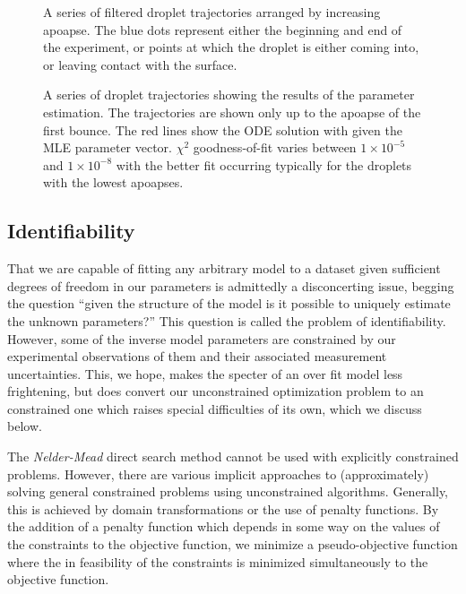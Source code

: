 \documentclass[12pt,a4paper,oneside]{book}
\begin{document}
\begin{figure}[h]
    \centering
    \resizebox{\textwidth}{!}{}
    \caption{A series of filtered droplet trajectories arranged by increasing apoapse. The blue dots represent either the beginning and end of the experiment, or points at which the droplet is either coming into, or leaving contact with the surface.}
    \label{fig:trajectories}
\end{figure}
\begin{figure}[h]
    \centering
    \resizebox{\textwidth}{!}{}
    \caption{A series of droplet trajectories showing the results of the parameter estimation. The trajectories are shown only up to the apoapse of the first bounce. The red lines show the ODE solution with given the MLE parameter vector. $\chi^2$ goodness-of-fit varies between $1 \times 10^{-5}$ and $1 \times 10^{-8}$ with the better fit occurring typically for the droplets with the lowest apoapses.}
    \label{fig:inverse_problem}
\end{figure}

\subsection{Identifiability}
That we are capable of fitting any arbitrary model to a dataset given sufficient degrees of freedom in our parameters is admittedly a disconcerting issue, begging the question ``given the structure of the model is it possible to uniquely estimate the unknown parameters?'' This question is called the problem of identifiability. However, some of the inverse model parameters are constrained by our experimental observations of them and their associated measurement uncertainties. This, we hope, makes the specter of an over fit model less frightening, but does convert our unconstrained optimization problem to an constrained one which raises special difficulties of its own, which we discuss below. 

The \emph{Nelder-Mead} direct search method cannot be used with explicitly constrained problems. However, there are various implicit approaches to (approximately) solving general constrained problems using unconstrained algorithms. Generally, this is achieved by domain transformations or the use of penalty functions.  By the addition of a penalty function which depends in some way on the values of the constraints to the objective function, we minimize a pseudo-objective function where the in feasibility of the constraints is minimized simultaneously to the objective function. 
\end{document}
